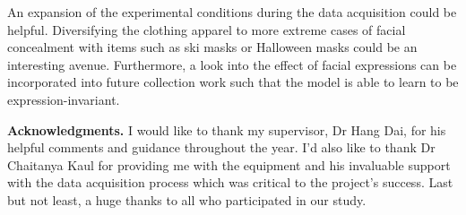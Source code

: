 \documentclass{mpaper}
\begin{document}
An expansion of the experimental conditions during the data acquisition could be helpful. Diversifying the clothing apparel to more extreme cases of facial concealment with items such as ski masks or Halloween masks could be an interesting avenue. Furthermore, a look into the effect of facial expressions can be incorporated into future collection work such that the model is able to learn to be expression-invariant.


\vspace{0.4cm}
{\bf Acknowledgments.}
I would like to thank my supervisor, Dr Hang Dai, for his helpful comments and guidance throughout the year. I'd also like to thank Dr Chaitanya Kaul for providing me with the equipment and his invaluable support with the data acquisition process which was critical to the project's success. Last but not least, a huge thanks to all who participated in our study.




\end{document}
